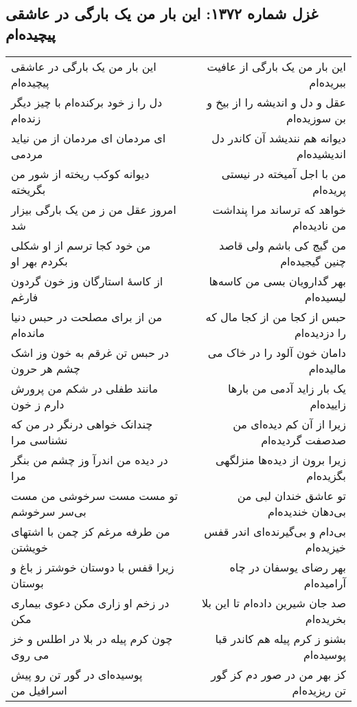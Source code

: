 \begin{center}
\section*{غزل شماره ۱۳۷۲: این بار من یک بارگی در عاشقی پیچیده‌ام}
\label{sec:1372}
\begin{longtable}{l p{0.5cm} r}
این بار من یک بارگی در عاشقی پیچیده‌ام
&&
این بار من یک بارگی از عافیت ببریده‌ام
\\
دل را ز خود برکنده‌ام با چیز دیگر زنده‌ام
&&
عقل و دل و اندیشه را از بیخ و بن سوزیده‌ام
\\
ای مردمان ای مردمان از من نیاید مردمی
&&
دیوانه هم نندیشد آن کاندر دل اندیشیده‌ام
\\
دیوانه کوکب ریخته از شور من بگریخته
&&
من با اجل آمیخته در نیستی پریده‌ام
\\
امروز عقل من ز من یک بارگی بیزار شد
&&
خواهد که ترساند مرا پنداشت من نادیده‌ام
\\
من خود کجا ترسم از او شکلی بکردم بهر او
&&
من گیج کی باشم ولی قاصد چنین گیجیده‌ام
\\
از کاسهٔ استارگان وز خون گردون فارغم
&&
بهر گدارویان بسی من کاسه‌ها لیسیده‌ام
\\
من از برای مصلحت در حبس دنیا مانده‌ام
&&
حبس از کجا من از کجا مال که را دزدیده‌ام
\\
در حبس تن غرقم به خون وز اشک چشم هر حرون
&&
دامان خون آلود را در خاک می مالیده‌ام
\\
مانند طفلی در شکم من پرورش دارم ز خون
&&
یک بار زاید آدمی من بارها زاییده‌ام
\\
چندانک خواهی درنگر در من که نشناسی مرا
&&
زیرا از آن کم دیده‌ای من صدصفت گردیده‌ام
\\
در دیده من اندرآ وز چشم من بنگر مرا
&&
زیرا برون از دیده‌ها منزلگهی بگزیده‌ام
\\
تو مست مست سرخوشی من مست بی‌سر سرخوشم
&&
تو عاشق خندان لبی من بی‌دهان خندیده‌ام
\\
من طرفه مرغم کز چمن با اشتهای خویشتن
&&
بی‌دام و بی‌گیرنده‌ای اندر قفس خیزیده‌ام
\\
زیرا قفس با دوستان خوشتر ز باغ و بوستان
&&
بهر رضای یوسفان در چاه آرامیده‌ام
\\
در زخم او زاری مکن دعوی بیماری مکن
&&
صد جان شیرین داده‌ام تا این بلا بخریده‌ام
\\
چون کرم پیله در بلا در اطلس و خز می روی
&&
بشنو ز کرم پیله هم کاندر قبا پوسیده‌ام
\\
پوسیده‌ای در گور تن رو پیش اسرافیل من
&&
کز بهر من در صور دم کز گور تن ریزیده‌ام
\\

\end{longtable}
\end{center}
